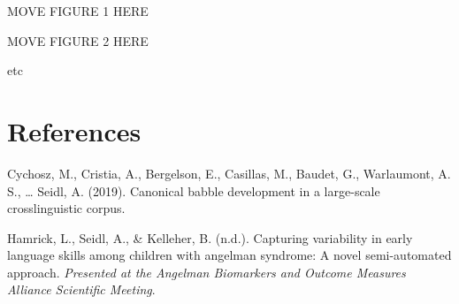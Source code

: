 \documentclass[english,,man,floatsintext]{apa6}
\begin{document}
\newpage

MOVE FIGURE 1 HERE

\newpage

MOVE FIGURE 2 HERE

etc

\hypertarget{references}{%
\section{References}\label{references}}

\setlength{\parindent}{-0.5in}
\setlength{\leftskip}{0.5in}

\hypertarget{refs}{}
\leavevmode\hypertarget{ref-cychosz2019canonical}{}%
Cychosz, M., Cristia, A., Bergelson, E., Casillas, M., Baudet, G., Warlaumont, A. S., \ldots{} Seidl, A. (2019). Canonical babble development in a large-scale crosslinguistic corpus.

\leavevmode\hypertarget{ref-hamrick2019capturing}{}%
Hamrick, L., Seidl, A., \& Kelleher, B. (n.d.). Capturing variability in early language skills among children with angelman syndrome: A novel semi-automated approach. \emph{Presented at the Angelman Biomarkers and Outcome Measures Alliance Scientific Meeting}.
\end{document}
